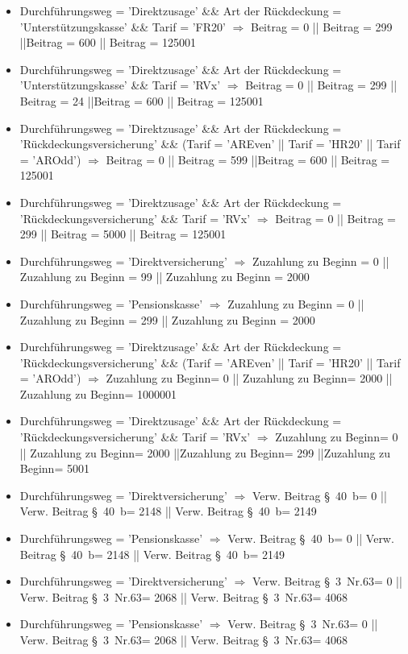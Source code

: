\begin{itemize}
\item Durchführungsweg = 'Direktzusage' \&\& Art der Rückdeckung = 'Unterstützungskasse' \&\& Tarif = 'FR20' $\Rightarrow$ Beitrag = 0 || Beitrag = 299 ||Beitrag = 600 || Beitrag = 125001
\item Durchführungsweg = 'Direktzusage' \&\& Art der Rückdeckung = 'Unterstützungskasse' \&\& Tarif = 'RVx' $\Rightarrow$ Beitrag = 0 || Beitrag = 299 || Beitrag = 24 ||Beitrag = 600 || Beitrag = 125001
\item Durchführungsweg = 'Direktzusage' \&\& Art der Rückdeckung = 'Rückdeckungsversicherung' \&\& (Tarif = 'AREven' || Tarif = 'HR20' || Tarif = 'AROdd') $\Rightarrow$ Beitrag = 0 || Beitrag = 599 ||Beitrag = 600 || Beitrag = 125001
\item Durchführungsweg = 'Direktzusage' \&\& Art der Rückdeckung = 'Rückdeckungsversicherung' \&\& Tarif = 'RVx' $\Rightarrow$ Beitrag = 0 || Beitrag = 299 || Beitrag = 5000 || Beitrag = 125001
\item Durchführungsweg = 'Direktversicherung' $\Rightarrow$ Zuzahlung zu Beginn = 0 || Zuzahlung zu Beginn = 99 || Zuzahlung zu Beginn = 2000
\item Durchführungsweg = 'Pensionskasse' $\Rightarrow$ Zuzahlung zu Beginn = 0 || Zuzahlung zu Beginn = 299 || Zuzahlung zu Beginn = 2000
\item Durchführungsweg = 'Direktzusage' \&\& Art der Rückdeckung = 'Rückdeckungsversicherung' \&\& (Tarif = 'AREven' || Tarif = 'HR20' || Tarif = 'AROdd') $\Rightarrow$ Zuzahlung zu Beginn= 0 || Zuzahlung zu Beginn= 2000 || Zuzahlung zu Beginn= 1000001
\item Durchführungsweg = 'Direktzusage' \&\& Art der Rückdeckung = 'Rückdeckungsversicherung' \&\& Tarif = 'RVx' $\Rightarrow$ Zuzahlung zu Beginn= 0 || Zuzahlung zu Beginn= 2000 ||Zuzahlung zu Beginn= 299 ||Zuzahlung zu Beginn= 5001
\item Durchführungsweg = 'Direktversicherung' $\Rightarrow$ Verw. Beitrag §~40~b= 0 || Verw. Beitrag §~40~b= 2148 || Verw. Beitrag §~40~b= 2149
\item Durchführungsweg = 'Pensionskasse' $\Rightarrow$ Verw. Beitrag §~40~b= 0 || Verw. Beitrag §~40~b= 2148 || Verw. Beitrag §~40~b= 2149
\item Durchführungsweg = 'Direktversicherung' $\Rightarrow$ Verw. Beitrag §~3~Nr.63= 0 || Verw. Beitrag §~3~Nr.63= 2068 || Verw. Beitrag §~3~Nr.63= 4068
\item Durchführungsweg = 'Pensionskasse' $\Rightarrow$ Verw. Beitrag §~3~Nr.63= 0 || Verw. Beitrag §~3~Nr.63= 2068 || Verw. Beitrag §~3~Nr.63= 4068
\end{itemize}

